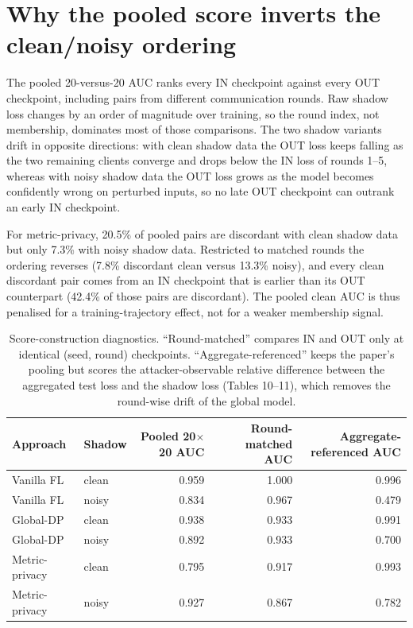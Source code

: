 \documentclass[10pt]{article}
\begin{document}
\clearpage
\section*{Why the pooled score inverts the clean/noisy ordering}
The pooled 20-versus-20 AUC ranks every IN checkpoint against every OUT checkpoint, including pairs from
different communication rounds. Raw shadow loss changes by an order of magnitude over training, so the round
index, not membership, dominates most of those comparisons. The two shadow variants drift in opposite
directions: with clean shadow data the OUT loss keeps falling as the two remaining clients converge and drops
below the IN loss of rounds 1--5, whereas with noisy shadow data the OUT loss grows as the model becomes
confidently wrong on perturbed inputs, so no late OUT checkpoint can outrank an early IN checkpoint.

For metric-privacy, 20.5\% of pooled pairs are discordant with clean shadow data but only
7.3\% with noisy shadow data. Restricted to matched rounds the ordering reverses
(7.8\% discordant clean versus 13.3\% noisy), and
every clean discordant pair comes from an IN checkpoint that is earlier than its OUT counterpart
(42.4\% of those pairs are discordant). The pooled clean AUC is thus penalised for a
training-trajectory effect, not for a weaker membership signal.

\begin{table}[h]
\centering
\caption{Score-construction diagnostics. ``Round-matched'' compares IN and OUT only at identical
(seed, round) checkpoints. ``Aggregate-referenced'' keeps the paper's pooling but scores the
attacker-observable relative difference between the aggregated test loss and the shadow loss
(Tables 10--11), which removes the round-wise drift of the global model.}
\begin{tabular}{llrrr}
\toprule
Approach & Shadow & Pooled 20$\times$20 AUC & Round-matched AUC & Aggregate-referenced AUC \\
\midrule
Vanilla FL & clean & 0.959 & 1.000 & 0.996 \\
Vanilla FL & noisy & 0.834 & 0.967 & 0.479 \\
\midrule
Global-DP & clean & 0.938 & 0.933 & 0.991 \\
Global-DP & noisy & 0.892 & 0.933 & 0.700 \\
\midrule
Metric-privacy & clean & 0.795 & 0.917 & 0.993 \\
Metric-privacy & noisy & 0.927 & 0.867 & 0.782 \\
\bottomrule
\end{tabular}
\end{table}
\end{document}
